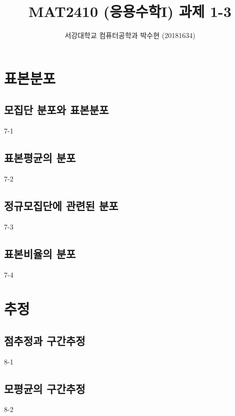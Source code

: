 



\title{MAT2410 (응용수학I) \space \newline 과제 1-3}
\author{서강대학교 컴퓨터공학과 박수현 (20181634)}
\maketitle

\setcounter{section}{6}

\section{표본분포}
\setcounter{subsection}{0}

\subsection{모집단 분포와 표본분포}
{7-1}

\newpage
\subsection{표본평균의 분포}
{7-2}

\newpage
\subsection{정규모집단에 관련된 분포}
{7-3}

\newpage
\subsection{표본비율의 분포}
{7-4}

\newpage
\section{추정}
\setcounter{subsection}{0}

\subsection{점추정과 구간추정}
{8-1}

\newpage
\subsection{모평균의 구간추정}
{8-2}

\newpage
